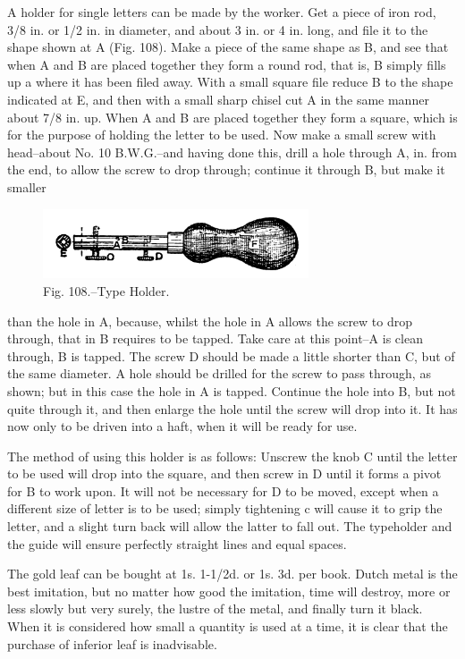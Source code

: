 \documentclass[twoside]{book}
\begin{document}
A holder for single letters can be made by the
worker. Get a piece of iron rod, 3/8 in. or 1/2 in. in
\pagebreak
diameter, and about 3 in. or 4 in. long, and file it to
the shape shown at A (Fig. 108). Make a piece of
the same shape as B, and see that when A and B
are placed together they form a round rod, that
is, B simply fills up a where it has been filed away.
With a small square file reduce B to the shape
indicated at E, and then with a small sharp chisel
cut A in the same manner about 7/8 in. up. When A
and B are placed together they form a square, which
is for the purpose of holding the letter to be used.
Now make a small screw with head--about No. 10
B.W.G.--and having done this, drill a hole through A,
in. from the end, to allow the screw to drop
through; continue it through B, but make it smaller
	\begin{figure}[h]
		\centering
		\includegraphics[width=0.7\textwidth]{Figures/_108.png}
		\caption*{Fig. 108.--Type Holder.}
	\end{figure}
than the hole in A, because, whilst the hole in A
allows the screw to drop through, that in B requires
to be tapped. Take care at this point--A is clean
through, B is tapped. The screw D should be made
a little shorter than C, but of the same diameter.
A hole should be drilled for the screw to pass
through, as shown; but in this case the hole in A
is tapped. Continue the hole into B, but not quite
through it, and then enlarge the hole until the screw
will drop into it. It has now only to be driven into
a haft, when it will be ready for use.

The method of using this holder is as follows:
Unscrew the knob C until the letter to be used will
drop into the square, and then screw in D until it
forms a pivot for B to work upon. It will not be
necessary for D to be moved, except when a different
size of letter is to be used; simply tightening c will
cause it to grip the letter, and a slight turn back
will allow the latter to fall out. The typeholder and
\pagebreak
the guide will ensure perfectly straight lines and
equal spaces.

The gold leaf can be bought at 1s. 1-1/2d. or 1s. 3d.
per book. Dutch metal is the best imitation, but
no matter how good the imitation, time will destroy,
more or less slowly but very surely, the lustre of
the metal, and finally turn it black. When it is
considered how small a quantity is used at a time, it is
clear that the purchase of inferior leaf is inadvisable.
\end{document}
